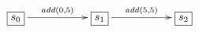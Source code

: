 $\xymatrix{
  \fbox{$s_0$} \ar[rr]^{add(0,5)} && \fbox{$s_1$} \ar[rr]^{add(5,5)} && \fbox{$s_2$}
}$

